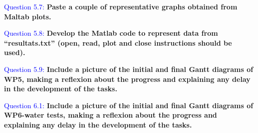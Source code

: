 \documentclass[12pt, a4papre]{article}
\begin{document}
	\textcolor{blue}{Question 5.7:} \textbf{Paste a couple of representative graphs obtained from Maltab plots.}
	
	\textcolor{blue}{Question 5.8:} \textbf{Develop the Matlab code to represent data from “resultats.txt” (open, read, plot and close instructions should be used).}
	
	\textcolor{blue}{Question 5.9:} \textbf{Include a picture of the initial and final Gantt diagrams of WP5, making a reflexion about the progress and explaining any delay in the development of the tasks.}
	
	\textcolor{blue}{Question 6.1:} \textbf{Include a picture of the initial and final Gantt diagrams of WP6-water tests, making a reflexion about the progress and explaining any delay in the development of the tasks.}
	
	
	

	
\end{document}

